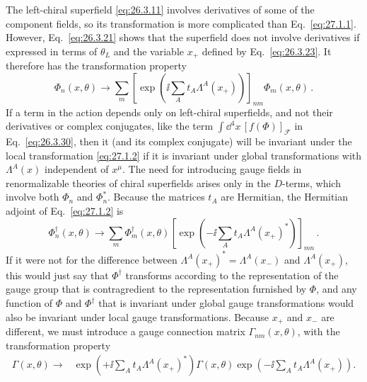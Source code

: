 The left-chiral superfield \eqref{eq:26.3.11} involves derivatives of some
of the component fields, so its transformation is more complicated than
Eq.~\eqref{eq:27.1.1}. However, Eq.~\eqref{eq:26.3.21} shows that the
superfield does not involve derivatives if expressed in terms of
\(\theta_L\) and the variable \(x_+\) defined by Eq.~\eqref{eq:26.3.23}.
It therefore has the transformation property
\begin{equation}
  \Phi_n(x,\theta)\longrightarrow
  \sum_m\left[
    \exp\left(\ii\sum_A t_A\Lambda^A(x_+)\right)
  \right]_{nm}\Phi_m(x,\theta)\,.
  \tag{27.1.2}\label{eq:27.1.2}
\end{equation}
If a term in the action depends only on left-chiral superfields, and not
their derivatives or complex conjugates, like the term
\(\int \dd^4x\,[f(\Phi)]_{\mathcal{F}}\) in Eq.~\eqref{eq:26.3.30}, then it
(and its complex conjugate) will be invariant under the local
transformation \eqref{eq:27.1.2} if it is invariant under global
transformations with \(\Lambda^A(x)\) independent of \(x^\mu\). The need
for introducing gauge fields in renormalizable theories of chiral
superfields arises only in the \(D\)-terms, which involve both \(\Phi_n\)
and \(\Phi_n^*\). Because the matrices \(t_A\) are Hermitian, the Hermitian
adjoint of Eq.~\eqref{eq:27.1.2} is
\begin{equation}
  \Phi_n^\dagger(x,\theta)\longrightarrow
  \sum_m\Phi_m^\dagger(x,\theta)
  \left[
    \exp\left(-\ii\sum_A t_A\Lambda^A(x_+)^*\right)
  \right]_{mn}\,.
  \tag{27.1.3}\label{eq:27.1.3}
\end{equation}
If it were not for the difference between
\(\Lambda^A(x_+)^*=\Lambda^A(x_-)\) and \(\Lambda^A(x_+)\), this would
just say that \(\Phi^\dagger\) transforms according to the representation
of the gauge group that is contragredient to the representation furnished
by \(\Phi\), and any function of \(\Phi\) and \(\Phi^\dagger\) that is
invariant under global gauge transformations would also be invariant under
local gauge transformations. Because \(x_+\) and \(x_-\) are different, we
must introduce a gauge connection matrix \(\Gamma_{nm}(x,\theta)\), with
the transformation property
\begin{equation}
  \begin{split}
  \Gamma(x,\theta)\longrightarrow{}&
  \exp\left(+\ii\sum_A t_A\Lambda^A(x_+)^*\right)
  \Gamma(x,\theta)
  \exp\left(-\ii\sum_A t_A\Lambda^A(x_+)\right).
  \end{split}
  \tag{27.1.4}\label{eq:27.1.4}
\end{equation}

